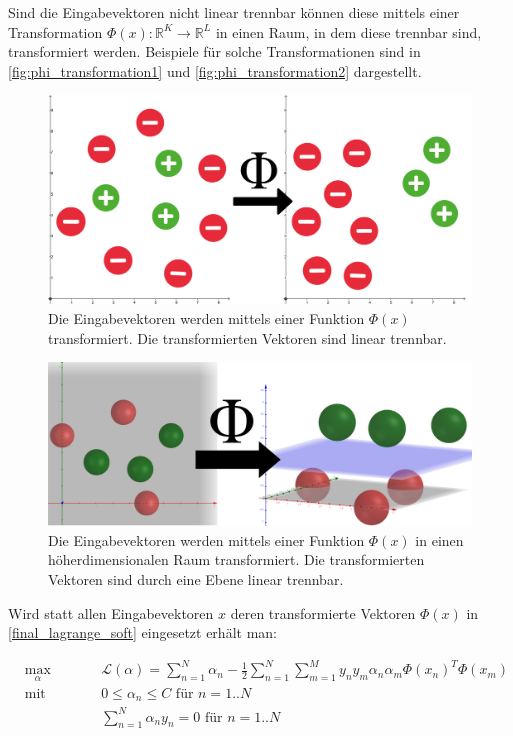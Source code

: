 \documentclass[a4paper,11pt,twoside]{scrreprt}
\newcommand{\Lagr}{\mathcal{L}}
\begin{document}
Sind die Eingabevektoren nicht linear trennbar können diese mittels einer Transformation $\Phi(x): \mathbb{R}^{K} \rightarrow \mathbb{R}^{L}$ in einen Raum, in dem diese trennbar sind, transformiert werden. Beispiele für solche Transformationen sind in \autoref{fig:phi_transformation1} und \autoref{fig:phi_transformation2} dargestellt.


\begin{figure}[H]
	\centering
	\includegraphics[width = 13cm]{assets/transformation.png}
	\caption{Die Eingabevektoren werden mittels einer Funktion $\Phi(x)$ transformiert. Die transformierten Vektoren sind linear trennbar.}
	\label{fig:phi_transformation1}
\end{figure}

\begin{figure}[H]
	\centering
	\includegraphics[width = 13cm]{assets/2d_to_3d_phi.png}
	\caption{Die Eingabevektoren werden mittels einer Funktion $\Phi(x)$ in einen höherdimensionalen Raum transformiert. Die transformierten Vektoren sind durch eine Ebene linear trennbar.}
	\label{fig:phi_transformation2}
\end{figure}



Wird statt allen Eingabevektoren $x$ deren transformierte Vektoren $\Phi(x)$ in \autoref{final_lagrange_soft} eingesetzt erhält man: 

\begin{subequations} \label{eq:soft_margin_with_transform}
	\begin{alignat}{2}
		&\!\max_{\alpha}        &\qquad&  	\Lagr(\alpha) = \sum_{n=1}^{N} \alpha_{n} - \frac{1}{2} \sum_{n=1}^{N} \sum_{m=1}^{M} y_{n} y_{m} \alpha_{n} \alpha_{m} \Phi(x_{n})^{T} \Phi(x_{m})\\
		&\text{mit } &      & 0 \leq \alpha_{n} \leq C \text{ für } n=1..N\\
		&       & & \sum_{n=1}^{N} \alpha_{n} y_{n} = 0\text{ für } n=1..N
	\end{alignat}
\end{subequations}
\end{document}
